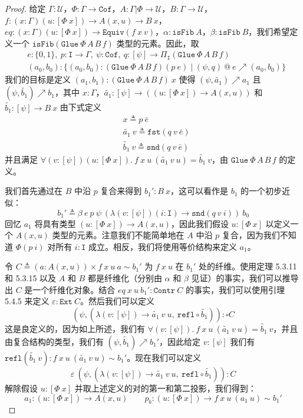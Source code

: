 \documentclass{ctexrep}
\theoremstyle{plain}
\theoremstyle{definition}
\theoremstyle{remark}
\newcommand\ttI{\mathtt{I}}
\begin{document}
\begin{proof}
给定 $\Gamma : \mathcal{U}$，$\Phi : \Gamma \to \mathtt{Cof}$，$A : \Gamma|\Phi \to \mathcal{U}$，$B : \Gamma \to \mathcal{U}$，$f : (x : \Gamma)(u : [\Phi\ x]) \to A(x, u) \to B\ x$，$eq : (x : \Gamma)(u : [\Phi\ x]) \to \mathtt{Equiv}(f\ x\ v)$，$\alpha : \mathtt{isFib}\ A$，$\beta : \mathtt{isFib}\ B$，我们希望定义一个 $\mathtt{isFib}(\mathtt{Glue}\ \Phi\,A\,B\,f)$ 类型的元素。因此，取
\begin{align*}
&e : \{0,1\},\ p : \ttI \to \Gamma,\ \psi : \mathtt{Cof},\ q : [\psi] \to \Pi_{\ttI}(\mathtt{Glue}\ \Phi\,A\,B\,f)\\
&(a_0, b_0) : \{(a_0, b_0) : (\mathtt{Glue}\ \Phi\,A\,B\,f)(p\ e) \mid (\psi, q)\ @\ e \nearrow (a_0, b_0)\}
\end{align*}
我们的目标是定义 $(a_1, b_1) : (\mathtt{Glue}\ \Phi\,A\,B\,f)\ x$ 使得 $(\psi, \tilde{a_1}) \nearrow a_1$ 且 $(\psi, \tilde{b_1}) \nearrow b_1$，其中 $x : \Gamma$，$\tilde{a_1} : [\psi] \to ((u : [\Phi\ x]) \to A(x, u))$ 和 $\tilde{b_1} : [\psi] \to B\ x$ 由下式定义
\begin{align*}
&x \triangleq p\ \bar{e}\\
&\tilde{a_1}\ v \triangleq \mathtt{fst}(q\ v\ \bar{e})\\
&\tilde{b_1}\ v \triangleq \mathtt{snd}(q\ v\ \bar{e})
\end{align*}
并且满足 $\forall(v : [\psi])(u : [\Phi\ x]).\ f\ x\ u\ (\tilde{a_1}\ v\ u) = \tilde{b_1}\ v$，由 $\mathtt{Glue}\ \Phi\,A\,B\,f$ 的定义。

我们首先通过在 $B$ 中沿 $p$ 复合来得到 $b_1' : B\ x$，这可以看作是 $b_1$ 的一个初步近似：
\[
b_1' \triangleq \beta\ e\ p\ \psi\ (\lambda(v : [\psi])(i : \ttI) \to \mathtt{snd}(q\ v\ i))\ b_0
\]
回忆 $a_1$ 将具有类型 $(u : [\Phi\ x]) \to A(x, u)$，因此我们假设 $u : [\Phi\ x]$ 以定义一个 $A(x, u)$ 类型的元素。注意我们不能简单地在 $A$ 中沿 $p$ 复合，因为我们不知道 $\Phi(p\ i)$ 对所有 $i : \ttI$ 成立。相反，我们将使用等价结构来定义 $a_1$。

令 $C \triangleq (a : A(x, u)) \times f\ x\ u\ a \sim b_1'$ 为 $f\ x\ u$ 在 $b_1'$ 处的纤维。使用定理 5.3.11 和 5.3.15 以及 $A$ 和 $B$ 都是纤维化（分别由 $\alpha$ 和 $\beta$ 见证）的事实，我们可以推导出 $C$ 是一个纤维化对象。结合 $eq\ x\ u\ b_1' : \mathtt{Contr}\ C$ 的事实，我们可以使用引理 5.4.5 来定义 $\varepsilon : \mathtt{Ext}\ C$。然后我们可以定义
\[
(\psi, (\lambda(v : [\psi]) \to \tilde{a_1}\ v\ u,\ \mathtt{refl} \circ \tilde{b_1})) : \square C
\]
这是良定义的，因为如上所述，我们有 $\forall(v : [\psi]).\ f\ x\ u\ (\tilde{a_1}\ v\ u) = \tilde{b_1}\ v$，并且由复合结构的类型，我们有 $(\psi, \tilde{b_1}) \nearrow b_1'$，因此给定 $v : [\psi]$ 我们有 $\mathtt{refl}(\tilde{b_1}\ v) : f\ x\ u\ (\tilde{a_1}\ v\ u) \sim b_1'$。现在我们可以定义
\[
\varepsilon\ (\psi, (\lambda(v : [\psi]) \to \tilde{a_1}\ v\ u,\ \mathtt{refl} \circ \tilde{b_1})) : C
\]
解除假设 $u : [\Phi\ x]$ 并取上述定义的对的第一和第二投影，我们得到：
\[
a_1 : (u : [\Phi\ x]) \to A(x, u) \qquad p_b : (u : [\Phi\ x]) \to f\ x\ u\ (a_1\ u) \sim b_1'
\]


\end{proof}
\end{document}
